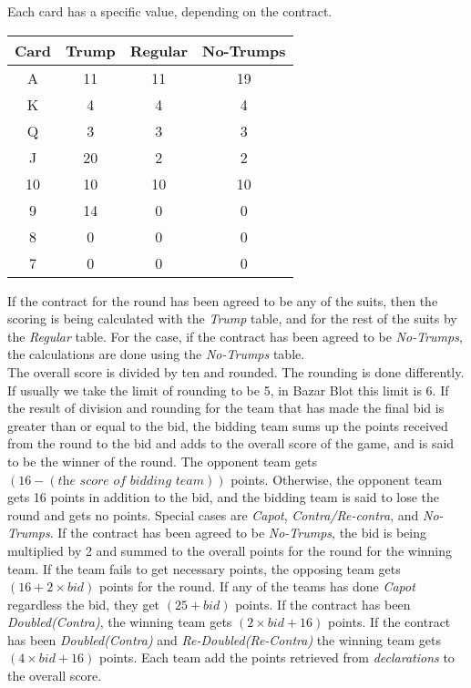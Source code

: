 Each card has a specific value, depending on the contract.
\begin{center}
    \begin{tabular}{|c|c|c|c|}
    \hline
    \textbf{Card} & \textbf{Trump} & \textbf{Regular} & \textbf{No-Trumps}\\
    \hline
    A & 11 & 11 & 19\\
    \hline
    K & 4 & 4 & 4\\
    \hline
    Q & 3 & 3 & 3\\
    \hline
    J & 20 & 2 & 2\\
    \hline
    10 & 10 & 10 & 10\\
    \hline
    9 & 14 & 0 & 0\\
    \hline
    8 & 0 & 0 & 0\\
    \hline
    7 & 0 & 0 & 0\\
    \hline
\end{tabular}
\end{center}
If the contract for the round has been agreed to be any of the suits, then the scoring is being calculated with the \textit{Trump} table, and for the rest of the suits by the \textit{Regular} table.
For the case, if the contract has been agreed to be \textit{No-Trumps}, the calculations are done using the \textit{No-Trumps} table.\\

The overall score is divided by ten and rounded.
The rounding is done differently.
If usually we take the limit of rounding to be 5, in Bazar Blot this limit is 6.
If the result of division and rounding for the team that has made the final bid is greater than or equal to the bid, the bidding team sums up the points received from the round to the bid and adds to the overall score of the game, and is said to be the winner of the round.
The opponent team gets $(16 - (\textit{the score of bidding team}))$ points.
Otherwise, the opponent team gets 16 points in addition to the bid, and the bidding team is said to lose the round and gets no points.
Special cases are \textit{Capot}, \textit{Contra/Re-contra}, and \textit{No-Trumps}.
If the contract has been agreed to be \textit{No-Trumps}, the bid is being multiplied by 2 and summed to the overall points for the round for the winning team.
If the team fails to get necessary points, the opposing team gets $(16 + 2 \times bid)$ points for the round.
If any of the teams has done \textit{Capot} regardless the bid, they get $(25+bid)$ points.
If the contract has been \textit{Doubled(Contra)}, the winning team gets $(2\times bid + 16)$ points.
If the contract has been \textit{Doubled(Contra)} and \textit{Re-Doubled(Re-Contra)} the winning team gets $(4\times bid + 16)$ points.
Each team add the points retrieved from \textit{declarations} to the overall score.


